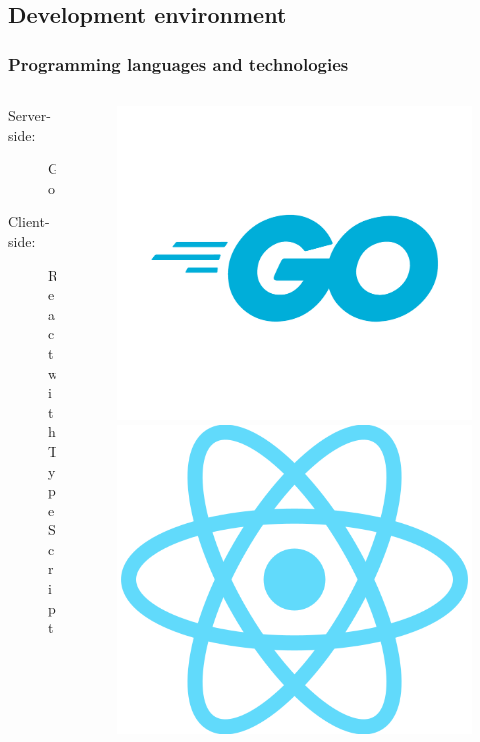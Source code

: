 \documentclass[aspectratio=169,16pt]{beamer}
\begin{document}
\subsection{Development environment}
\begin{frame}
    \frametitle{Programming languages and technologies}
    \begin{columns}[onlytextwidth]
        \begin{column}{0.65\textwidth}
            \begin{description}
                \item [Server-side:]Go
                \item [Client-side:]React with TypeScript
            \end{description}
        \end{column}
        \begin{column}{0.35\textwidth}
            \vspace{-2em}
            \begin{figure}
                \includegraphics[height=.3\paperheight]{Go-Logo_Blue}
                \includegraphics[height=.3\paperheight]{React-Logo}

\end{figure}
\end{column}
\end{columns}
\end{frame}
\end{document}
